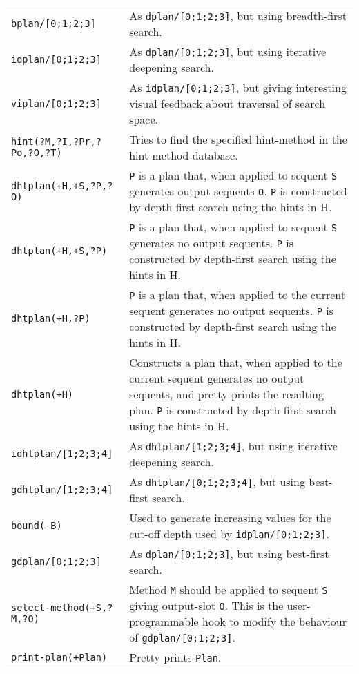 {\begin{supertabular}{@{}lp{.5\textwidth}@{}}
{\tt bplan/[0;1;2;3]} & As {\tt dplan/[0;1;2;3]}, but using
		breadth-first search. \\
{\tt idplan/[0;1;2;3]} & As {\tt dplan/[0;1;2;3]}, but using
		iterative deepening search. \\
{\tt viplan/[0;1;2;3]} & As {\tt idplan/[0;1;2;3]}, but giving interesting
		visual feedback about traversal of search space. \\
{\tt hint(?M,?I,?Pr,?Po,?O,?T)} & Tries to find the specified hint-method in
                the hint-method-database.\\
{\tt dhtplan(+H,+S,?P,?O)} & {\tt P} is a plan that, when applied to
                sequent {\tt S} generates output sequents {\tt O}.
                {\tt P} is constructed by depth-first search using the
                hints in H. \\
{\tt dhtplan(+H,+S,?P)} & {\tt P} is a plan that, when applied to sequent {
                \tt S} generates no output sequents.
                {\tt P} is constructed by depth-first search using the
                hints in H. \\
{\tt dhtplan(+H,?P)} & {\tt P} is a plan that, when applied to the current
                sequent generates no output sequents.
                {\tt P} is constructed by depth-first search using the
                hints in H. \\
{\tt dhtplan(+H)} & Constructs a plan that, when applied to the current
                sequent generates no output sequents, and pretty-prints the
                resulting plan.
                {\tt P} is constructed by depth-first search using the
                hints in H.\\
{\tt idhtplan/[1;2;3;4]} & As {\tt dhtplan/[1;2;3;4]}, but using
                iterative deepening search. \\
{\tt gdhtplan/[1;2;3;4]} & As {\tt dhtplan/[0;1;2;3;4]}, but using
                best-first search. \\
{\tt bound(-B)} & Used to generate increasing values for the cut-off
		depth used by {\tt idplan/[0;1;2;3]}.\\
{\tt gdplan/[0;1;2;3]} & As {\tt dplan/[0;1;2;3]}, but using
		best-first search. \\
{\tt select-method(+S,?M,?O)} & Method {\tt M} should be applied to
		sequent {\tt S} giving output-slot {\tt O}. This is
		the user-programmable hook to modify the behaviour
		of {\tt gdplan/[0;1;2;3]}.\\
{\tt print-plan(+Plan)} & Pretty prints {\tt Plan}.\\

\end{supertabular}}
